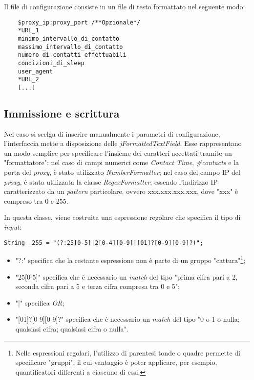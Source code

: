 Il file di configurazione consiste in un file di testo formattato nel seguente modo:

\vspace{0.5cm}
\begin{lstlisting}
	$proxy_ip:proxy_port /**Opzionale*/
	*URL_1
	minimo_intervallo_di_contatto
	massimo_intervallo_di_contatto
	numero_di_contatti_effettuabili
	condizioni_di_sleep
	user_agent
	*URL_2
	[...]
\end{lstlisting}

\subsection{Immissione e scrittura}
Nel caso si scelga di inserire manualmente i parametri di configurazione, l'interfaccia mette a disposizione delle \textit{jFormattedTextField}. Esse rappresentano un modo semplice per specificare l'insieme dei caratteri accettati tramite un "formattatore": nel caso di campi numerici come \textit{Contact Time}, \textit{\#contacts} e la porta del \textit{proxy}, \`{e} stato utilizzato \textit{NumberFormatter}; nel caso del campo IP del \textit{proxy}, \`{e} stata utilizzata la classe \textit{RegexFormatter}, essendo l'indirizzo IP caratterizzato da un \textit{pattern} particolare, ovvero xxx.xxx.xxx.xxx, dove "xxx" \`{e} compreso tra 0 e 255.

In questa classe, viene costruita una espressione regolare che specifica il tipo di \textit{input}:

\vspace{0.5cm}
\begin{lstlisting}
String _255 = "(?:25[0-5]|2[0-4][0-9]|[01]?[0-9][0-9]?)";
\end{lstlisting}

\begin{itemize}
	\item "?:" specifica che la restante espressione non \`{e} parte di un gruppo "cattura"\footnote{Nelle espressioni regolari, l'utilizzo di parentesi tonde o quadre permette di specificare "gruppi", il cui vantaggio \`{e} poter applicare, per esempio, quantificatori differenti a ciascuno di essi.};
	\item "25[0-5]" specifica che \`{e} necessario un \textit{match} del tipo "prima cifra pari a 2, seconda cifra pari a 5 e terza cifra compresa tra 0 e 5";
	\item "|" specifica \textit{OR};
	\item "[01]?[0-9][0-9]?" specifica che \`{e} necessario un \textit{match} del tipo "0 o 1 o nulla; qualsiasi cifra; qualsiasi cifra o nulla".
\end{itemize}

